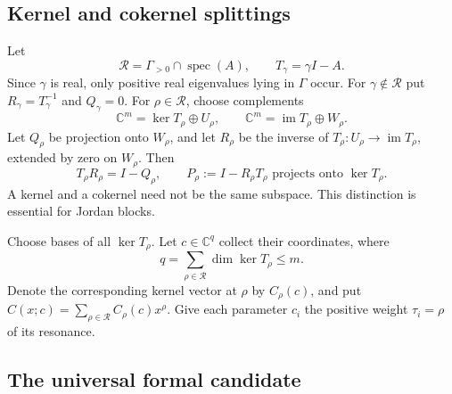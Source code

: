 \documentclass[11pt,a4paper]{article}
\numberwithin{equation}{section}
\theoremstyle{definition}
\theoremstyle{remark}
\newcommand{\C}{\mathbb C}
\newcommand{\G}{\Gamma}
\newcommand{\Res}{\mathcal R}
\newcommand{\spec}{\operatorname{spec}}
\begin{document}
\subsection{Kernel and cokernel splittings}
Let
\begin{equation}\label{eq:resonance}
 \Res=\G_{>0}\cap\spec(A),\qquad T_\gamma=\gamma I-A.
\end{equation}
Since $\gamma$ is real, only positive real eigenvalues lying in $\G$ occur.
For $\gamma\notin\Res$ put $R_\gamma=T_\gamma^{-1}$ and $Q_\gamma=0$.
For $\rho\in\Res$, choose complements
\[
 \C^m=\ker T_\rho\oplus U_\rho,
 \qquad \C^m=\operatorname{im}T_\rho\oplus W_\rho.
\]
Let $Q_\rho$ be projection onto $W_\rho$, and let $R_\rho$ be the inverse
of $T_\rho:U_\rho\to\operatorname{im}T_\rho$, extended by zero on
$W_\rho$. Then
\begin{equation}\label{eq:splitting}
 T_\rho R_\rho=I-Q_\rho,\qquad
 P_\rho:=I-R_\rho T_\rho
 \text{ projects onto }\ker T_\rho.
\end{equation}
A kernel and a cokernel need not be the same subspace. This distinction is
essential for Jordan blocks.

Choose bases of all $\ker T_\rho$. Let $c\in\C^q$ collect their
coordinates, where
\begin{equation}\label{eq:q}
 q=\sum_{\rho\in\Res}\dim\ker T_\rho\leq m.
\end{equation}
Denote the corresponding kernel vector at $\rho$ by $C_\rho(c)$, and put
$C(x;c)=\sum_{\rho\in\Res}C_\rho(c)x^\rho$. Give each parameter $c_i$
the positive weight $\tau_i=\rho$ of its resonance.

\subsection{The universal formal candidate}
\end{document}
